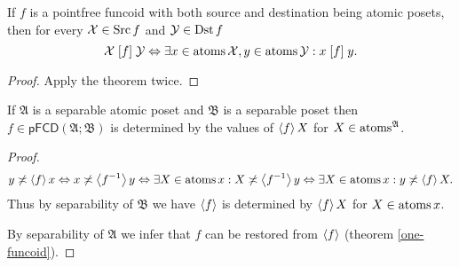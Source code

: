 \begin{cor}
\label{pf-suprel-atoms}If $f$ is a pointfree funcoid with both source
and destination being atomic posets, then for every $\mathcal{X}\in\operatorname{Src} f$
and $\mathcal{Y}\in\operatorname{Dst} f$
\[
\mathcal{X}\mathrel{\left[f\right]}\mathcal{Y}\Leftrightarrow\exists x\in\operatorname{atoms}\mathcal{X},y\in\operatorname{atoms}\mathcal{Y}:x\mathrel{\left[f\right]}y.
\]
\end{cor}
\begin{proof}
Apply the theorem twice.\end{proof}
\begin{cor}
If $\mathfrak{A}$ is a separable atomic poset and $\mathfrak{B}$
is a separable poset then $f\in\mathsf{pFCD}(\mathfrak{A};\mathfrak{B})$
is determined by the values of $\left\langle f\right\rangle X$ for $X\in\operatorname{atoms}^{\mathfrak{A}}$.\end{cor}
\begin{proof}
~
\[
y\not\asymp\left\langle f\right\rangle x\Leftrightarrow x\not\asymp\left\langle f^{-1}\right\rangle y\Leftrightarrow\exists X\in\operatorname{atoms} x:X\not\asymp\left\langle f^{-1}\right\rangle y\Leftrightarrow\exists X\in\operatorname{atoms} x:y\not\asymp\left\langle f\right\rangle X.
\]
Thus by separability of $\mathfrak{B}$ we have $\left\langle f\right\rangle$ is determined
by $\left\langle f\right\rangle X$ for $X\in\operatorname{atoms} x$.

By separability of $\mathfrak{A}$ we infer that $f$ can be restored
from $\left\langle f\right\rangle$ (theorem \ref{one-funcoid}).\end{proof}
